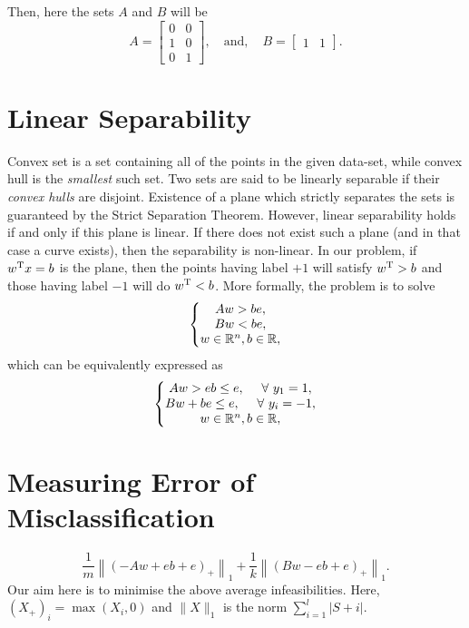 \noindent
Then, here the sets $A$ and $B$ will be
$$A = \begin{bmatrix}
	0 & 0 \\ 1 & 0 \\ 0 & 1
\end{bmatrix}, \quad \mathrm{and,} \quad
B = \begin{bmatrix}
	1 & 1
\end{bmatrix}.$$


\section{Linear Separability}
Convex set is a set containing all of the points in the given data-set, while convex hull is the {\itshape smallest} such set.
Two sets are said to be linearly separable if their {\itshape convex hulls} are disjoint. Existence of a plane which strictly separates the sets is guaranteed by the Strict Separation Theorem. However, linear separability holds if and only if this plane is linear. If there does not exist such a plane (and in that case a curve exists), then the separability is non-linear. In our problem, if $w^{\mathrm{T}} x = b$ is the plane, then the points having label $+1$ will satisfy $w^{\mathrm{T}} > b$ and those having label $-1$ will do $w^{\mathrm{T}} < b$. More formally, the problem is to solve
$$\left\{\begin{matrix}
	Aw > be, \\ Bw < be, \\ w \in \mathbb{R}^n, b \in \mathbb{R},
\end{matrix}\right.$$
which can be equivalently expressed as
$$\left\{\begin{matrix}
	Aw > eb \le e, \quad \forall y_1 = 1, \\ Bw + be \le e, \quad \forall y_i = -1, \\ w \in \bb R^n, b \in \bb R,
\end{matrix}\right.$$

\section{Measuring Error of Misclassification}

$$\boxed{\frac1m\left\|(-Aw + eb + e)_+ \right\|_1 + \frac1k \left\| (Bw -eb  + e)_+ \right\|_1.}$$
Our aim here is to minimise the above average infeasibilities. Here, $(X_+)_i = \max(X_i, 0)$ and $\|X\|_1$ is the norm $\sum_{i=1}^l|S+i|$.

